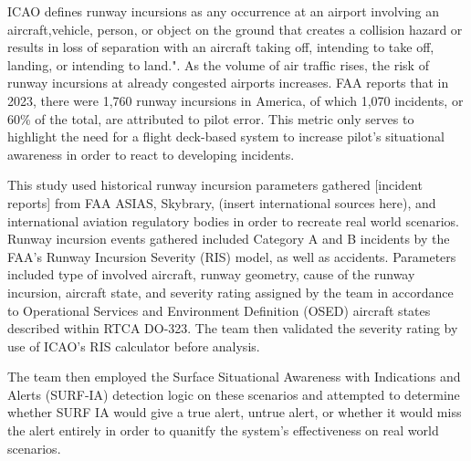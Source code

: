 ICAO defines runway incursions as any occurrence at an airport involving an aircraft,vehicle, person, or object on the ground that creates a collision hazard or results in loss of separation with an aircraft taking off, intending to take off, landing, or intending to land.". As the volume of air traffic rises, the risk of runway incursions at already congested airports increases. FAA reports that in 2023, there were 1,760 runway incursions in America, of which 1,070 incidents, or 60\% of the total, are attributed to pilot error. This metric only serves to highlight the need for a flight deck-based system to increase pilot's situational awareness in order to react to developing incidents. \newline

This study used historical runway incursion parameters gathered [incident reports] from FAA ASIAS, Skybrary, (insert international sources here), and international aviation regulatory bodies in order to recreate real world scenarios. Runway incursion events gathered included Category A and B incidents by the FAA's Runway Incursion Severity (RIS) model, as well as accidents. Parameters included type of involved aircraft, runway geometry, cause of the runway incursion, aircraft state, and severity rating assigned by the team in accordance to Operational Services and Environment Definition (OSED) aircraft states described within RTCA DO-323. The team then validated the severity rating by use of ICAO's RIS calculator before analysis.


The team then employed the Surface Situational Awareness with Indications and Alerts (SURF-IA) detection logic on these scenarios and attempted to determine whether SURF IA would give a true alert, untrue alert, or whether it would miss the alert entirely in order to quanitfy the system's effectiveness on real world scenarios. 